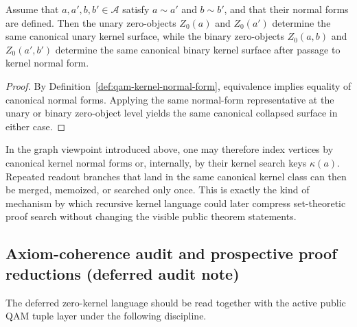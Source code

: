 \begin{lemma}\label{lem:qam-zero-normal-form}
Assume that $a,a',b,b'\in\mathcal A$ satisfy $a\sim a'$ and $b\sim b'$, and that their normal forms are defined. Then the unary zero-objects $Z_0(a)$ and $Z_0(a')$ determine the same canonical unary kernel surface, while the binary zero-objects $Z_0(a,b)$ and $Z_0(a',b')$ determine the same canonical binary kernel surface after passage to kernel normal form.
\end{lemma}

\begin{proof}
By Definition~\ref{def:qam-kernel-normal-form}, equivalence implies equality of canonical normal forms. Applying the same normal-form representative at the unary or binary zero-object level yields the same canonical collapsed surface in either case.
\end{proof}

\begin{remark}\label{rem:qam-kernel-search}
In the graph viewpoint introduced above, one may therefore index vertices by canonical kernel normal forms or, internally, by their kernel search keys $\kappa(a)$. Repeated readout branches that land in the same canonical kernel class can then be merged, memoized, or searched only once. This is exactly the kind of mechanism by which recursive kernel language could later compress set-theoretic proof search without changing the visible public theorem statements.
\end{remark}


\subsection*{Axiom-coherence audit and prospective proof reductions (deferred audit note)}

The deferred zero-kernel language should be read together with the active public QAM tuple layer under the following discipline.

